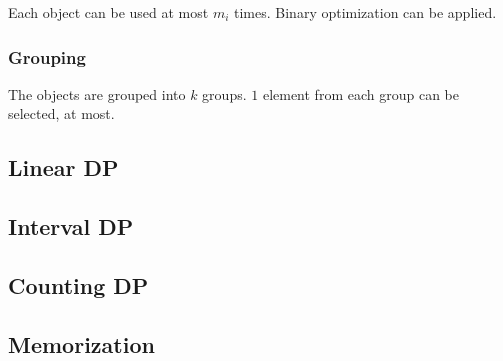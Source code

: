 \documentclass{article}
\begin{document}
Each object can be used at most $m_i$ times. Binary optimization can be applied.

\subsubsection{Grouping}

The objects are grouped into $k$ groups. $1$ element from each group can be selected, at most.


\subsection{Linear DP}
\subsection{Interval DP}
\subsection{Counting DP}
\subsection{Memorization}
\end{document}
